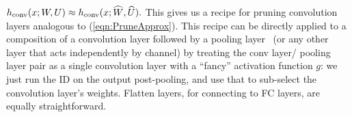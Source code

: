 $%
    h_{\Conv}(x; W, U)
    \approx
    h_{\Conv}(x; \widehat{W}, \widehat{U}).
$ %
This gives us a recipe for pruning convolution layers analogous to (\ref{eqn:PruneApprox}).
This recipe can be directly applied to a composition of a convolution layer followed by a pooling layer~\cite{goodfellow2016deep} (or any other layer that acts independently by channel) by treating the conv layer/ pooling layer pair as a single convolution layer with a ``fancy'' activation function $g$: we just run the ID on the output post-pooling, and use that to sub-select the convolution layer's weights.
Flatten layers, for connecting to FC layers, are equally straightforward.





